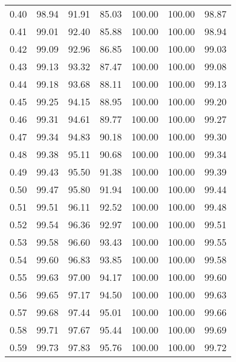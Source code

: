\begin{tabular}{|c|c|c|c|c|c|c|}
      0.40 &     98.94 &     91.91 &      85.03 &  100.00 &     100.00 &         98.87 \\
      0.41 &     99.01 &     92.40 &      85.88 &  100.00 &     100.00 &         98.94 \\
      0.42 &     99.09 &     92.96 &      86.85 &  100.00 &     100.00 &         99.03 \\
      0.43 &     99.13 &     93.32 &      87.47 &  100.00 &     100.00 &         99.08 \\
      0.44 &     99.18 &     93.68 &      88.11 &  100.00 &     100.00 &         99.13 \\
      0.45 &     99.25 &     94.15 &      88.95 &  100.00 &     100.00 &         99.20 \\
      0.46 &     99.31 &     94.61 &      89.77 &  100.00 &     100.00 &         99.27 \\
      0.47 &     99.34 &     94.83 &      90.18 &  100.00 &     100.00 &         99.30 \\
      0.48 &     99.38 &     95.11 &      90.68 &  100.00 &     100.00 &         99.34 \\
      0.49 &     99.43 &     95.50 &      91.38 &  100.00 &     100.00 &         99.39 \\
      0.50 &     99.47 &     95.80 &      91.94 &  100.00 &     100.00 &         99.44 \\
      0.51 &     99.51 &     96.11 &      92.52 &  100.00 &     100.00 &         99.48 \\
      0.52 &     99.54 &     96.36 &      92.97 &  100.00 &     100.00 &         99.51 \\
      0.53 &     99.58 &     96.60 &      93.43 &  100.00 &     100.00 &         99.55 \\
      0.54 &     99.60 &     96.83 &      93.85 &  100.00 &     100.00 &         99.58 \\
      0.55 &     99.63 &     97.00 &      94.17 &  100.00 &     100.00 &         99.60 \\
      0.56 &     99.65 &     97.17 &      94.50 &  100.00 &     100.00 &         99.63 \\
      0.57 &     99.68 &     97.44 &      95.01 &  100.00 &     100.00 &         99.66 \\
      0.58 &     99.71 &     97.67 &      95.44 &  100.00 &     100.00 &         99.69 \\
      0.59 &     99.73 &     97.83 &      95.76 &  100.00 &     100.00 &         99.72 \\

\end{tabular}
